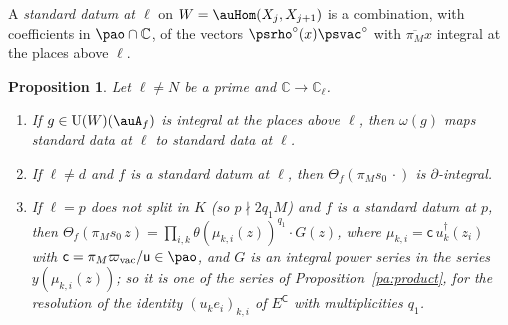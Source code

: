 \documentclass[10pt]{amsart}
\newtheorem{proposition}[theorem]{Proposition}
\theoremstyle{definition}
\theoremstyle{remark}
\newcommand{\C}{\mathbb C}
\providecommand{\auU}{\mathrm U}
\providecommand{\aubar}[1]{\overline{#1}}
\begin{document}
A \emph{standard datum at $\ell$} on $W=\auHom(X_j,X_{j+1})$ is a combination, with coefficients
in $\pao\cap\C$, of the vectors $\psrho^\circ(x)\psvac^\circ$ with $\aubar{\pi_M}x$ integral at
the places above $\ell$.

\begin{proposition}\label{pk:std}
Let $\ell\ne N$ be a prime and $\C\to\C_\ell$.
\begin{enumerate}
\item[(S1)] If $g\in\auU(W)(\auA_f)$ is integral at the places above $\ell$, then $\omega(g)$ maps
standard data at $\ell$ to standard data at $\ell$.
\item[(S2)] If $\ell\ne d$ and $f$ is a standard datum at $\ell$, then
$\Theta_f(\pi_Ms_0\,\cdot)$ is $\partial$-integral.
\item[(S3)] If $\ell=p$ does not split in $K$ (so $p\nmid2q_1M$) and $f$ is a standard datum at
$p$, then $\Theta_f(\pi_Ms_0\,z)=\prod_{i,k}\theta(\mu_{k,i}(z))^{q_1}\cdot G(z)$, where
$\mu_{k,i}=\mathsf c\,u_k^\dagger(z_i)$ with $\mathsf c=\pi_M\varpi_{\mathrm{vac}}/\mathsf u\in
\pao$, and $G$ is an integral power series in the series $y(\mu_{k,i}(z))$; so it is one of the
series of Proposition~\ref{pa:product}, for the resolution of the identity $(u_ke_i)_{k,i}$ of
$E^{\mathsf C}$ with multiplicities $q_1$.
\end{enumerate}
\end{proposition}
\end{document}

